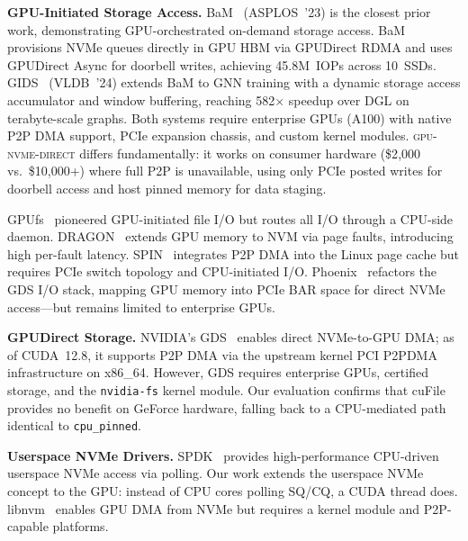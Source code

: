 \documentclass{article}
\newcommand{\sysname}{\textsc{gpu-nvme-direct}}
\begin{document}
\textbf{GPU-Initiated Storage Access.}
BaM~\cite{qureshi2023bam} (ASPLOS~'23) is the closest prior work, demonstrating
GPU-orchestrated on-demand storage access. BaM provisions NVMe queues directly
in GPU HBM via GPUDirect RDMA and uses GPUDirect Async for doorbell writes,
achieving 45.8M~IOPs across 10~SSDs. GIDS~\cite{park2024gids} (VLDB~'24)
extends BaM to GNN training with a dynamic storage access accumulator and
window buffering, reaching 582$\times$ speedup over DGL on terabyte-scale
graphs. Both systems require enterprise GPUs (A100) with native P2P DMA
support, PCIe expansion chassis, and custom kernel modules. \sysname{} differs
fundamentally: it works on consumer hardware (\$2{,}000 vs.\ \$10{,}000+)
where full P2P is unavailable, using only PCIe posted writes for doorbell
access and host pinned memory for data staging.

GPUfs~\cite{silberstein2014gpufs} pioneered GPU-initiated file I/O but routes
all I/O through a CPU-side daemon. DRAGON~\cite{markthub2018dragon} extends GPU
memory to NVM via page faults, introducing high per-fault latency.
SPIN~\cite{bergman2017spin} integrates P2P DMA into the Linux page cache
but requires PCIe switch topology and CPU-initiated I/O.
Phoenix~\cite{phoenix2025} refactors the GDS I/O stack, mapping GPU memory into
PCIe BAR space for direct NVMe access---but remains limited to enterprise GPUs.

\textbf{GPUDirect Storage.}
NVIDIA's GDS~\cite{gds} enables direct NVMe-to-GPU DMA; as of CUDA~12.8, it
supports P2P DMA via the upstream kernel PCI P2PDMA infrastructure on x86\_64.
However, GDS requires enterprise GPUs, certified storage, and the
\texttt{nvidia-fs} kernel module. Our evaluation confirms that cuFile provides
no benefit on GeForce hardware, falling back to a CPU-mediated path identical
to \texttt{cpu\_pinned}.

\textbf{Userspace NVMe Drivers.}
SPDK~\cite{spdk} provides high-performance CPU-driven userspace NVMe access via
polling. Our work extends the userspace NVMe concept to the GPU: instead of CPU
cores polling SQ/CQ, a CUDA thread does. libnvm~\cite{markussen2021smartio}
enables GPU DMA from NVMe but requires a kernel module and P2P-capable platforms.
\end{document}
